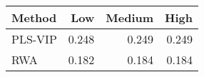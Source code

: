 \begin{small}
\begin{ttfamily}
\begin{tabular}{lrrr}
\toprule
Method & Low & Medium & High \\
\midrule
PLS-VIP & 0.248 & 0.249 & 0.249 \\
RWA & 0.182 & 0.184 & 0.184 \\
\bottomrule
\end{tabular}
\end{ttfamily}
\end{small}
